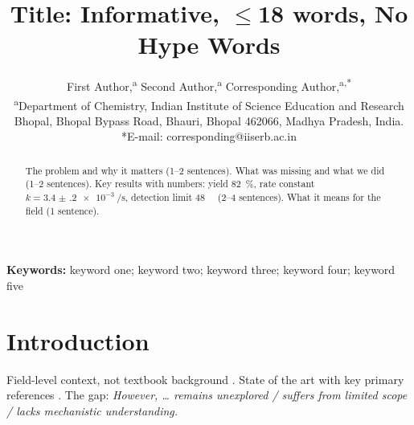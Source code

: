 \documentclass[12pt,a4paper]{article}
\title{\bfseries Title: Informative, $\le$18 words, No Hype Words}
\author{First Author,\textsuperscript{a} Second Author,\textsuperscript{a} Corresponding Author,\textsuperscript{a,*}\\
  \textsuperscript{a}Department of Chemistry, Indian Institute of Science Education and
  Research Bhopal, Bhopal Bypass Road, Bhauri, Bhopal 462066, Madhya Pradesh, India.\\
  *E-mail: corresponding@iiserb.ac.in}
\date{}
\begin{document}
\maketitle
\thispagestyle{empty}

\begin{abstract}
\noindent The problem and why it matters (1--2 sentences). What was missing and
what we did (1--2 sentences). Key results with numbers: yield \SI{82}{\percent},
rate constant $k=\SI{3.4(2)e-3}{\per\second}$, detection limit
\SI{48}{\nano\molar} (2--4 sentences). What it means for the field (1 sentence).
\end{abstract}

\noindent\textbf{Keywords:} keyword one; keyword two; keyword three; keyword four;
keyword five

\begin{center}
\end{center}

\section{Introduction}
\label{sec:intro}

Field-level context, not textbook background \citep{romero2016organic}. State of
the art with key primary references \citep{xin2026recent,yang2023recent}.
The gap: \emph{However, \ldots{} remains unexplored / suffers from limited scope /
lacks mechanistic understanding.}
\end{document}
